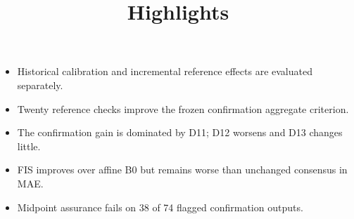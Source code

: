 \documentclass[11pt,a4paper]{article}
\title{Highlights}
\date{}
\begin{document}
\maketitle
\begin{itemize}
\item Historical calibration and incremental reference effects are evaluated separately.
\item Twenty reference checks improve the frozen confirmation aggregate criterion.
\item The confirmation gain is dominated by D11; D12 worsens and D13 changes little.
\item FIS improves over affine B0 but remains worse than unchanged consensus in MAE.
\item Midpoint assurance fails on 38 of 74 flagged confirmation outputs.
\end{itemize}
\end{document}
